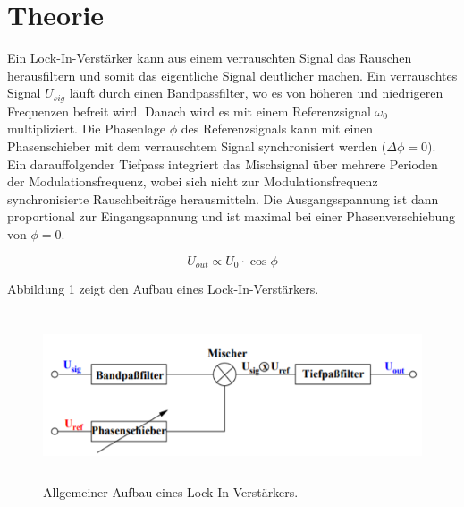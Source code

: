 \section{Theorie}
\label{sec:Theorie}

Ein Lock-In-Verstärker kann aus einem verrauschten Signal das Rauschen herausfiltern und somit
das eigentliche Signal deutlicher machen. Ein verrauschtes Signal $U_{sig}$ läuft durch einen Bandpassfilter, wo es
von höheren und niedrigeren Frequenzen befreit wird. Danach wird es mit einem Referenzsignal $\omega_0$
multipliziert. Die Phasenlage $\phi$ des Referenzsignals kann mit einen Phasenschieber mit dem
verrauschtem Signal synchronisiert werden ($\Delta \phi = 0$). Ein darauffolgender Tiefpass integriert das Mischsignal
über mehrere Perioden der Modulationsfrequenz, wobei sich nicht zur Modulationsfrequenz synchronisierte Rauschbeiträge herausmitteln.
Die Ausgangsspannung ist dann proportional zur Eingangsapnnung und ist maximal bei einer Phasenverschiebung von $\phi = 0$.

\begin{equation}
  U_{out} \propto U_0 \cdot \cos{\phi}
\end{equation}


Abbildung 1 zeigt den Aufbau eines Lock-In-Verstärkers.

\begin{figure}[H]
  \centering
  \includegraphics[height=5cm]{Lock.PNG}
  \caption{Allgemeiner Aufbau eines Lock-In-Verstärkers. \cite{sample}}
  \label{fig:Lock}
\end{figure}
